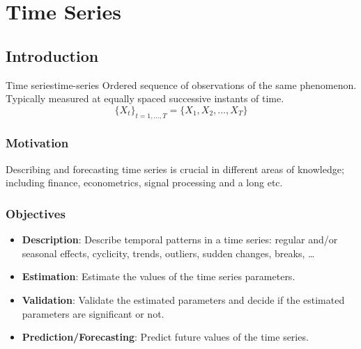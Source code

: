 \chapter{Time Series}
\section{Introduction}

\begin{definition}{Time series}{time-series}
	Ordered sequence of observations of the same phenomenon. Typically
	measured at equally spaced successive instants of time.
	\begin{equation*}
		\{X_t\}_{t=1,\ldots,T} = \{X_1, X_2, \ldots, X_T\}
	\end{equation*}
\end{definition}

\subsection{Motivation}

Describing and forecasting time series is crucial in different areas of
knowledge; including finance, econometrics, signal processing and a long etc.

\subsection{Objectives}

\begin{itemize}
	\item \textbf{Description}: Describe temporal patterns in a time series: regular and/or
	      seasonal effects, cyclicity, trends, outliers, sudden changes, breaks, \dots
	\item \textbf{Estimation}: Estimate the values of the time series parameters.
	\item \textbf{Validation}: Validate the estimated parameters and decide if the estimated
	      parameters are significant or not.
	\item \textbf{Prediction/Forecasting}: Predict future values of the time series.
\end{itemize}

